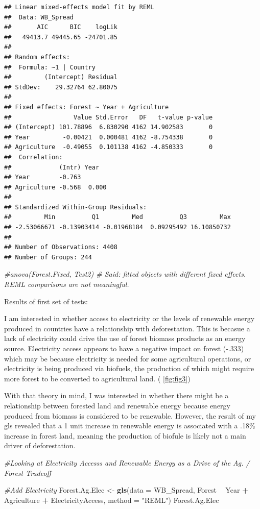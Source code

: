 \documentclass[12pt,]{article}
\newenvironment{Shaded}{\begin{snugshade}}{\end{snugshade}}
\newcommand{\KeywordTok}[1]{\textcolor[rgb]{0.13,0.29,0.53}{\textbf{#1}}}
\newcommand{\DataTypeTok}[1]{\textcolor[rgb]{0.13,0.29,0.53}{#1}}
\newcommand{\StringTok}[1]{\textcolor[rgb]{0.31,0.60,0.02}{#1}}
\newcommand{\CommentTok}[1]{\textcolor[rgb]{0.56,0.35,0.01}{\textit{#1}}}
\newcommand{\OperatorTok}[1]{\textcolor[rgb]{0.81,0.36,0.00}{\textbf{#1}}}
\newcommand{\NormalTok}[1]{#1}
\begin{document}
\begin{verbatim}
## Linear mixed-effects model fit by REML
##  Data: WB_Spread 
##       AIC      BIC    logLik
##   49413.7 49445.65 -24701.85
## 
## Random effects:
##  Formula: ~1 | Country
##         (Intercept) Residual
## StdDev:    29.32764 62.80075
## 
## Fixed effects: Forest ~ Year + Agriculture 
##                 Value Std.Error   DF   t-value p-value
## (Intercept) 101.78896  6.830290 4162 14.902583       0
## Year         -0.00421  0.000481 4162 -8.754338       0
## Agriculture  -0.49055  0.101138 4162 -4.850333       0
##  Correlation: 
##             (Intr) Year  
## Year        -0.763       
## Agriculture -0.568  0.000
## 
## Standardized Within-Group Residuals:
##         Min          Q1         Med          Q3         Max 
## -2.53066671 -0.13903414 -0.01968184  0.09295492 16.10850732 
## 
## Number of Observations: 4408
## Number of Groups: 244
\end{verbatim}

\begin{Shaded}
\begin{Highlighting}[]
\CommentTok{#anova(Forest.Fixed, Test2) # Said: fitted objects with different fixed effects. REML comparisons are not meaningful.}
\end{Highlighting}
\end{Shaded}

Results of first set of tests:

I am interested in whether access to electricity or the levels of
renewable energy produced in countries have a relationship with
deforestation. This is becasue a lack of electricity could drive the use
of forest biomass products as an energy source. Electricity access
appears to have a negative impact on forest (-.333) which may be because
electricity is needed for some agricultural operations, or electricity
is being produced via biofuels, the production of which might require
more forest to be converted to agricultural land. ( \ref{fig:fig3})

With that theory in mind, I was interested in whether there might be a
relationship between forested land and renewable energy because energy
produced from biomass is considered to be renewable. However, the result
of my gls revealed that a 1 unit increase in renewable energy is
associated with a .18\% increase in forest land, meaning the production
of biofule is likely not a main driver of deforestation.

\begin{Shaded}
\begin{Highlighting}[]
\CommentTok{#Looking at Electricity Accesss and Renewable Energy as a Drive of the Ag. / Forest Tradeoff}

\CommentTok{#Add Electricity }
\NormalTok{Forest.Ag.Elec <-}\StringTok{ }\KeywordTok{gls}\NormalTok{(}\DataTypeTok{data =}\NormalTok{ WB_Spread, }
\NormalTok{                    Forest }\OperatorTok{~}\StringTok{ }\NormalTok{Year }\OperatorTok{+}\StringTok{ }\NormalTok{Agriculture }\OperatorTok{+}\StringTok{ }\NormalTok{ElectricityAccess,}
                    \DataTypeTok{method =} \StringTok{"REML"}\NormalTok{)}
\NormalTok{Forest.Ag.Elec}
\end{Highlighting}
\end{Shaded}
\end{document}
